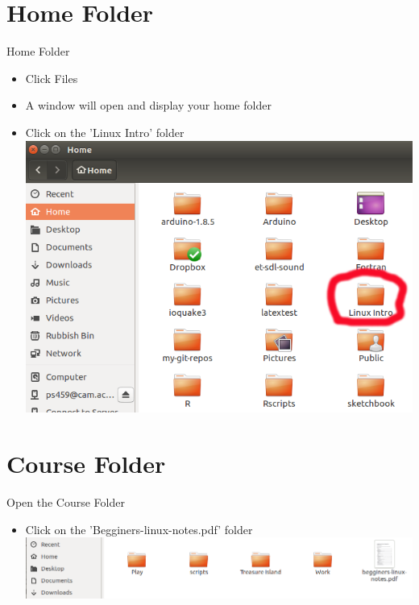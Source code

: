 \section{Home Folder}
\begin{frame}{Home Folder}
\begin{itemize}
\item Click Files
\item A window will open and display your home folder
\item Click on the 'Linux Intro' folder
\includegraphics[height=0.5\textheight]{imgs/HomeFolder.png}
\end{itemize}
\end{frame}

\section{Course Folder}
\begin{frame}{Open the Course Folder}
\begin{itemize}
\item Click on the 'Begginers-linux-notes.pdf' folder
\includegraphics[height=0.2\textheight]{imgs/LinuxIntroFolder.png}
\end{itemize}
\end{frame}

